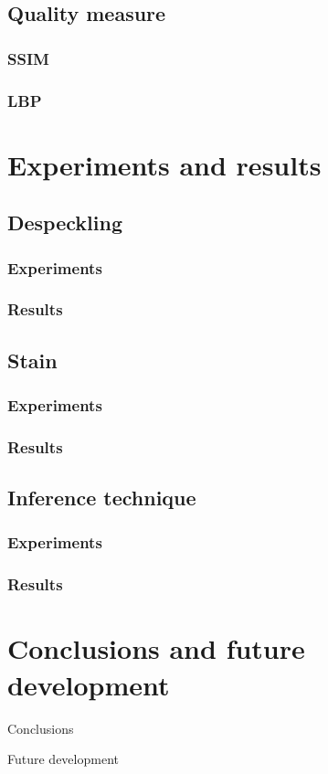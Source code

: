 \documentclass[t]{beamer}
\begin{document}
\subsection{Quality measure}

\begin{frame}
\frametitle{SSIM}
\end{frame}


\begin{frame}
\frametitle{LBP}
\end{frame}


\section{Experiments and results}

\subsection{Despeckling}

\begin{frame}
\frametitle{Experiments}
\end{frame}

\begin{frame}
\frametitle{Results}
\end{frame}

\subsection{Stain}

\begin{frame}
\frametitle{Experiments}
\end{frame}

\begin{frame}
\frametitle{Results}
\end{frame}

\subsection{Inference technique}

\begin{frame}
\frametitle{Experiments}
\end{frame}

\begin{frame}
\frametitle{Results}
\end{frame}


\section{Conclusions and future development}

\begin{frame}{Conclusions}
\end{frame}

\begin{frame}{Future development}
\end{frame}
\end{document}
